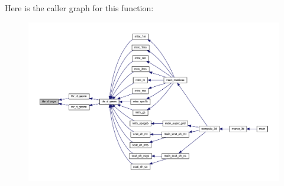 Here is the caller graph for this function\+:
\nopagebreak
\begin{figure}[H]
\begin{center}
\leavevmode
\includegraphics[width=350pt]{Marco_8f90_adcdc2c34804046e9cedb66856cd33a73_icgraph}
\end{center}
\end{figure}
\mbox{\label{Marco_8f90_a451df71e46f877dff01e7f6310bca641}} 
